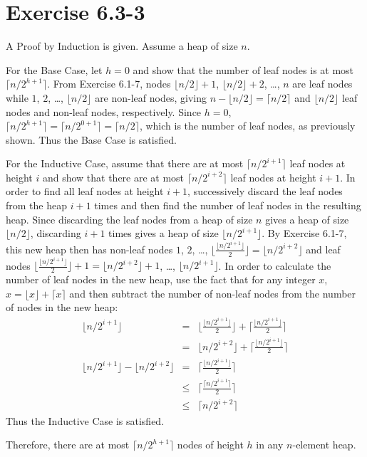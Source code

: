 \documentclass{article}
\begin{document}
\section*{Exercise 6.3-3}

A Proof by Induction is given. Assume a heap of size $n$.

For the Base Case, let $h = 0$ and show that the number of leaf nodes is at most $\lceil n / 2^{h+1} \rceil$. From Exercise 6.1-7, nodes $\lfloor n / 2 \rfloor + 1$, $\lfloor n / 2 \rfloor + 2$, \ldots, $n$ are leaf nodes while $1$, $2$, \ldots, $\lfloor n / 2 \rfloor$ are non-leaf nodes, giving $n - \lfloor n / 2 \rfloor = \lceil n / 2 \rceil$ and $\lfloor n / 2 \rfloor$ leaf nodes and non-leaf nodes, respectively. Since $h = 0$, $\lceil n / 2^{h+1} \rceil = \lceil n / 2^{0+1} \rceil = \lceil n / 2 \rceil$, which is the number of leaf nodes, as previously shown. Thus the Base Case is satisfied.

For the Inductive Case, assume that there are at most $\lceil n / 2^{i+1} \rceil$ leaf nodes at height $i$ and show that there are at most $\lceil n / 2^{i+2} \rceil$ leaf nodes at height $i + 1$. In order to find all leaf nodes at height $i + 1$, successively discard the leaf nodes from the heap $i+1$ times and then find the number of leaf nodes in the resulting heap. Since discarding the leaf nodes from a heap of size $n$ gives a heap of size $\lfloor n / 2 \rfloor$, discarding $i + 1$ times gives a heap of size $\lfloor n / 2^{i+1} \rfloor$. By Exercise 6.1-7, this new heap then has non-leaf nodes $1$, $2$, \ldots, $\lfloor \frac{\lfloor n / 2^{i+1} \rfloor}{2} \rfloor = \lfloor n / 2^{i+2} \rfloor$ and leaf nodes $\lfloor \frac{\lfloor n / 2^{i+1} \rfloor}{2} \rfloor + 1 = \lfloor n / 2^{i+2} \rfloor + 1$, \ldots, $\lfloor n / 2^{i+1} \rfloor$. In order to calculate the number of leaf nodes in the new heap, use the fact that for any integer $x$, $x = \lfloor x \rfloor + \lceil x \rceil$ and then subtract the number of non-leaf nodes from the number of nodes in the new heap:
\begin{eqnarray*}
	\lfloor n / 2^{i+1} \rfloor & = & \lfloor \frac{\lfloor n / 2^{i+1} \rfloor}{2} \rfloor + \lceil \frac{\lfloor n / 2^{i+1} \rfloor}{2} \rceil \\
	& = & \lfloor n / 2^{i+2} \rfloor + \lceil \frac{ \lfloor n / 2^{i+1} \rfloor}{2} \rceil \\
	\lfloor n / 2^{i+1} \rfloor - \lfloor n / 2^{i+2} \rfloor & = & \lceil \frac{\lfloor n / 2^{i+1} \rfloor}{2} \rceil \\
	& \leq & \lceil \frac{\lceil n / 2^{i+1} \rceil}{2} \rceil \\
	& \leq & \lceil n / 2^{i+2} \rceil
\end{eqnarray*}
Thus the Inductive Case is satisfied.

Therefore, there are at most $\lceil n / 2^{h+1} \rceil$ nodes of height $h$ in any $n$-element heap.
\end{document}
